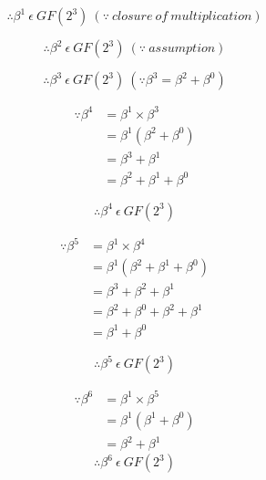 \documentclass[paper=usletter, fontsize=12pt]{article}
\begin{document}
            \[ \therefore \beta^{1} \ \epsilon \ GF(2^{3}) \ (\because \ closure \ of \ multiplication) \]

            \[ \therefore \beta^{2} \ \epsilon \ GF(2^{3}) \ (\because \ assumption) \]

            \[ \therefore \beta^{3} \ \epsilon \ GF(2^{3}) \ (\because \beta^{3}=\beta^{2}+\beta^{0}) \]

            \begin{equation*}
                \begin{split}
                    \because \beta^{4} & = \beta^{1} \times \beta^{3} \\
                    & = \beta^{1} (\beta^{2}+\beta^{0}) \\
                    & = \beta^{3}+\beta^{1} \\
                    & = \beta^{2}+\beta^{1}+\beta^{0}
                \end{split}
            \end{equation*}

            \[ \therefore \beta^{4} \ \epsilon \ GF(2^{3}) \]

            \begin{equation*}
                \begin{split}
                    \because \beta^{5} & = \beta^{1} \times \beta^{4} \\
                    & = \beta^{1} (\beta^{2}+\beta^{1}+\beta^{0}) \\
                    & = \beta^{3}+\beta^{2}+\beta^{1} \\
                    & = \beta^{2}+\beta^{0}+\beta^{2}+\beta^{1} \\
                    & = \beta^{1}+\beta^{0}
                \end{split}
            \end{equation*}

            \[ \therefore \beta^{5} \ \epsilon \ GF(2^{3}) \]

            \begin{equation*}
                \begin{split}
                    \because \beta^{6} & = \beta^{1} \times \beta^{5} \\
                    & = \beta^{1} (\beta^{1}+\beta^{0}) \\
                    & = \beta^{2}+\beta^{1}
                \end{split}
            \end{equation*}
            \[ \therefore \beta^{6} \ \epsilon \ GF(2^{3}) \]
\end{document}
